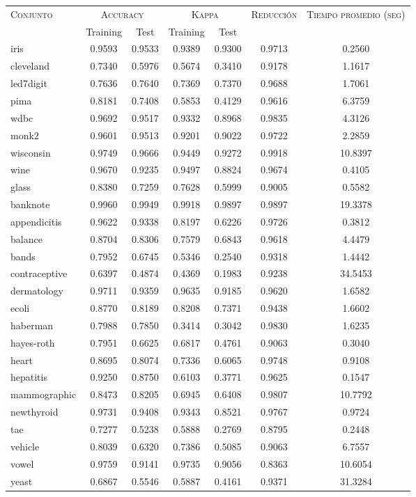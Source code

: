 \begin{table}[]
\centering
\begin{tabular}{l c c c c c c}
\hline
\multirow{2}{*}{\textsc{Conjunto}}
	& \multicolumn{2}{c}{\textsc{Accuracy}}
	& \multicolumn{2}{c}{\textsc{Kappa}}
	& \textsc{Reducción}
	& \textsc{Tiempo promedio (seg)} \\
	& Training & Test
	& Training & Test \\ 
\hline
\hline

iris & 0.9593 & 0.9533 & 0.9389 & 0.9300 & 0.9713 & 0.2560 \\
cleveland & 0.7340 & 0.5976 & 0.5674 & 0.3410 & 0.9178 & 1.1617 \\
led7digit & 0.7636 & 0.7640 & 0.7369 & 0.7370 & 0.9688 & 1.7061 \\
pima & 0.8181 & 0.7408 & 0.5853 & 0.4129 & 0.9616 & 6.3759 \\
wdbc & 0.9692 & 0.9517 & 0.9332 & 0.8968 & 0.9835 & 4.3126 \\
monk2 & 0.9601 & 0.9513 & 0.9201 & 0.9022 & 0.9722 & 2.2859 \\
wisconsin & 0.9749 & 0.9666 & 0.9449 & 0.9272 & 0.9918 & 10.8397 \\
wine & 0.9670 & 0.9235 & 0.9497 & 0.8824 & 0.9674 & 0.4105 \\
glass & 0.8380 & 0.7259 & 0.7628 & 0.5999 & 0.9005 & 0.5582 \\
banknote & 0.9960 & 0.9949 & 0.9918 & 0.9897 & 0.9897 & 19.3378 \\
appendicitis & 0.9622 & 0.9338 & 0.8197 & 0.6226 & 0.9726 & 0.3812 \\
balance & 0.8704 & 0.8306 & 0.7579 & 0.6843 & 0.9618 & 4.4479 \\
bands & 0.7952 & 0.6745 & 0.5346 & 0.2540 & 0.9318 & 1.4442 \\
contraceptive & 0.6397 & 0.4874 & 0.4369 & 0.1983 & 0.9238 & 34.5453 \\
dermatology & 0.9711 & 0.9359 & 0.9635 & 0.9185 & 0.9620 & 1.6582 \\
ecoli & 0.8770 & 0.8189 & 0.8208 & 0.7371 & 0.9438 & 1.6602 \\
haberman & 0.7988 & 0.7850 & 0.3414 & 0.3042 & 0.9830 & 1.6235 \\
hayes-roth & 0.7951 & 0.6625 & 0.6817 & 0.4761 & 0.9063 & 0.3040 \\
heart & 0.8695 & 0.8074 & 0.7336 & 0.6065 & 0.9748 & 0.9108 \\
hepatitis & 0.9250 & 0.8750 & 0.6103 & 0.3771 & 0.9625 & 0.1547 \\
mammographic & 0.8473 & 0.8205 & 0.6945 & 0.6408 & 0.9807 & 10.7792 \\
newthyroid & 0.9731 & 0.9408 & 0.9343 & 0.8521 & 0.9767 & 0.9724 \\
tae & 0.7277 & 0.5238 & 0.5888 & 0.2769 & 0.8795 & 0.2448 \\
vehicle & 0.8039 & 0.6320 & 0.7386 & 0.5085 & 0.9063 & 6.7557 \\
vowel & 0.9759 & 0.9141 & 0.9735 & 0.9056 & 0.8363 & 10.6054 \\
yeast & 0.6867 & 0.5546 & 0.5887 & 0.4161 & 0.9371 & 31.3284 \\


\end{tabular}
\end{table}
